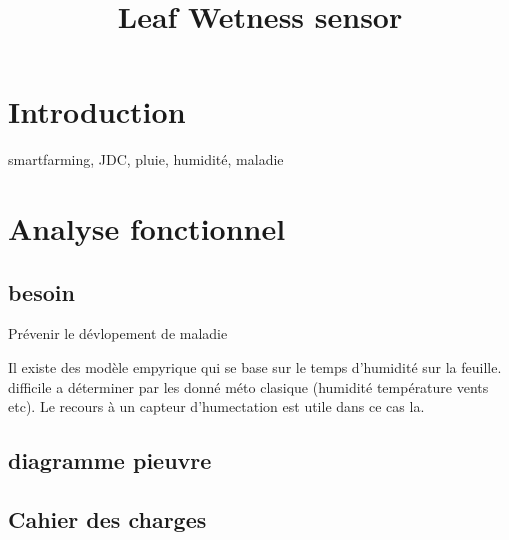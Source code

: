 \documentclass[a4paper,11pt,twoside,openright]{article} %
\begin{document}
\title{Leaf Wetness sensor}

\maketitle

\newpage

\section{Introduction}
smartfarming, JDC, pluie, humidité, maladie

\section{Analyse fonctionnel}
\subsection{besoin}
Prévenir le dévlopement de maladie

Il existe des modèle empyrique qui se base sur le temps d'humidité sur la feuille. difficile a déterminer par les donné méto clasique (humidité température vents etc). Le recours à un capteur d'humectation est utile dans ce cas la.

\subsection{diagramme pieuvre}

\subsection{Cahier des charges}
\end{document}
